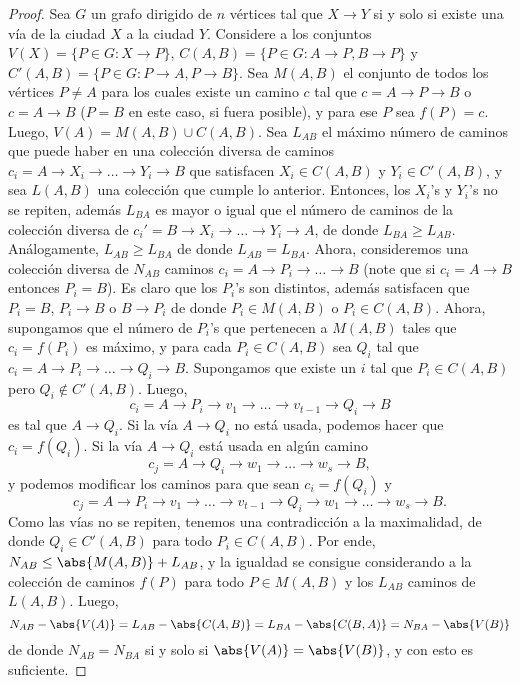 \begin{proof}
  Sea $G$ un grafo dirigido de $n$ vértices tal que $X\to Y$ si y solo si existe
  una vía de la ciudad $X$ a la ciudad $Y$. Considere a los conjuntos
  $V(X)=\{P\in G:X\to P\}$, $C(A,B)=\{P\in G:A\to P,B\to P\}$ y
  $C'(A,B)=\{P\in G:P\to A,P\to B\}$. Sea $M(A,B)$ el conjunto de todos los
  vértices $P\ne A$ para los cuales existe un camino $c$ tal que $c=A\to P\to B$
  o $c=A\to B$ ($P=B$ en este caso, si fuera posible), y para ese $P$ sea
  $f(P)=c$. Luego, $V(A)=M(A,B)\cup C(A,B)$. Sea $L_{AB}$ el máximo número de
  caminos que puede haber en una colección diversa de caminos
  $c_i=A\to X_i\to\dots\to Y_i\to B$ que satisfacen $X_i\in C(A,B)$ y
  $Y_i\in C'(A,B)$, y sea $L(A,B)$ una colección que cumple lo anterior.
  Entonces, los $X_i$'s y $Y_i$'s no se repiten, además $L_{BA}$ es mayor o
  igual que el número de caminos de la colección diversa de
  $c_i'=B\to X_i\to\dots\to Y_i\to A$, de donde $L_{BA}\ge L_{AB}$.
  Análogamente, $L_{AB}\ge L_{BA}$ de donde $L_{AB}=L_{BA}$. Ahora, consideremos
  una colección diversa de $N_{AB}$ caminos $c_i=A\to P_i\to\dots\to B$ (note
  que si $c_i=A\to B$ entonces $P_i=B$). Es claro que los $P_i$'s son distintos,
  además satisfacen que $P_i=B$, $P_i\to B$ o $B\to P_i$ de donde
  $P_i\in M(A,B)$ o $P_i\in C(A,B)$. Ahora, supongamos que el número de $P_i$'s
  que pertenecen a $M(A,B)$ tales que $c_i=f(P_i)$ es máximo, y para cada
  $P_i\in C(A,B)$ sea $Q_i$ tal que $c_i=A\to P_i\to\dots\to Q_i\to B$.
  Supongamos que existe un $i$ tal que $P_i\in C(A,B)$ pero
  $Q_i\not\in C'(A,B)$. Luego,
  \[c_i=A\to P_i\to v_1\to\dots\to v_{t-1}\to Q_i\to B\]
  es tal que $A\to Q_i$. Si la vía $A\to Q_i$ no está usada, podemos hacer que
  $c_i=f(Q_i)$. Si la vía $A\to Q_i$ está usada en algún camino
  \[c_j=A\to Q_i\to w_1\to\dots\to w_s\to B,\]
  y podemos modificar los caminos para que sean $c_i=f(Q_i)$ y
  \[c_j=A\to P_i\to v_1\to\dots\to v_{t-1}\to Q_i\to w_1\to\dots\to w_s\to B.\]
  Como las vías no se repiten, tenemos una contradicción a la maximalidad, de
  donde $Q_i\in C'(A,B)$ para todo $P_i\in C(A,B)$. Por ende,
  $N_{AB}\le\abs{M(A,B)}+L_{AB}$, y la igualdad se consigue considerando a la
  colección de caminos $f(P)$ para todo $P\in M(A,B)$ y los $L_{AB}$ caminos de
  $L(A,B)$. Luego,
  \[
    N_{AB}-\abs{V(A)}
    =L_{AB}-\abs{C(A,B)}
    =L_{BA}-\abs{C(B,A)}
    =N_{BA}-\abs{V(B)}
  \]
  de donde $N_{AB}=N_{BA}$ si y solo si $\abs{V(A)}=\abs{V(B)}$, y con esto es
  suficiente.
\end{proof}

